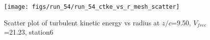 \begin{figure}[H]
\centering
\texttt{[image: figs/run\_54/run\_54\_ctke\_vs\_r\_mesh\_scatter]}
\caption{Scatter plot of turbulent kinetic energy vs radius at $z/c$=9.50, $V_{free}$=21.23, station6}
\label{fig:run_54_ctke_vs_r_mesh_scatter}
\end{figure}


